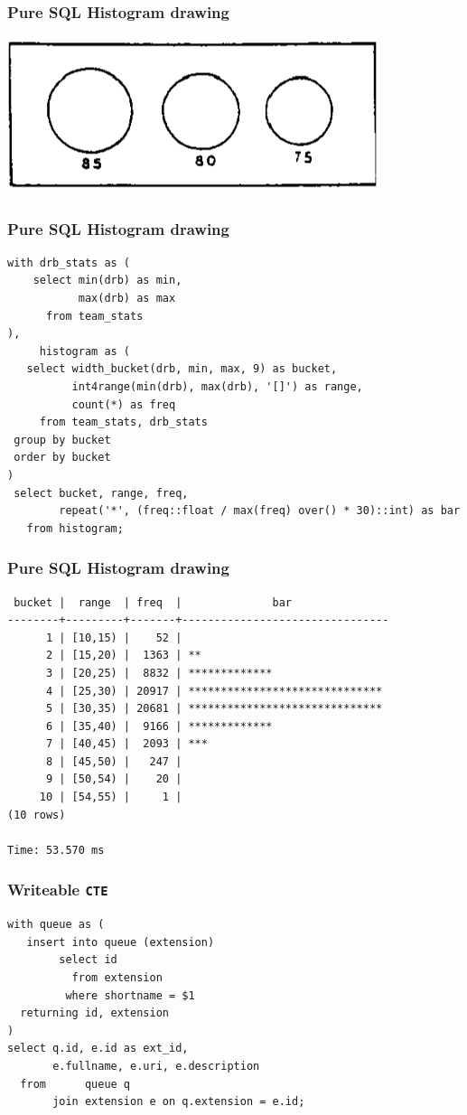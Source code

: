 \documentclass{beamer}
\begin{document}
\begin{frame}
  \frametitle{Pure SQL Histogram drawing}

  \begin{center}
    \includegraphics[height=1.8in]{histogram.png}
  \end{center}
\end{frame}

\begin{frame}[fragile]
  \frametitle{Pure SQL Histogram drawing}
  
  \begin{verbatim}
with drb_stats as (
    select min(drb) as min,
           max(drb) as max
      from team_stats
),
     histogram as (
   select width_bucket(drb, min, max, 9) as bucket,
          int4range(min(drb), max(drb), '[]') as range,
          count(*) as freq
     from team_stats, drb_stats
 group by bucket
 order by bucket
)
 select bucket, range, freq,
        repeat('*', (freq::float / max(freq) over() * 30)::int) as bar
   from histogram;
  \end{verbatim}
\end{frame}

\begin{frame}[fragile]
  \frametitle{Pure SQL Histogram drawing}
  
  \begin{verbatim}
 bucket |  range  | freq  |              bar               
--------+---------+-------+--------------------------------
      1 | [10,15) |    52 | 
      2 | [15,20) |  1363 | **
      3 | [20,25) |  8832 | *************
      4 | [25,30) | 20917 | ******************************
      5 | [30,35) | 20681 | ******************************
      6 | [35,40) |  9166 | *************
      7 | [40,45) |  2093 | ***
      8 | [45,50) |   247 | 
      9 | [50,54) |    20 | 
     10 | [54,55) |     1 | 
(10 rows)

Time: 53.570 ms
\end{verbatim}
\end{frame}

\begin{frame}[fragile]
  \frametitle{Writeable \texttt{CTE}}
  
  \begin{verbatim}
with queue as (
   insert into queue (extension)
        select id
          from extension
         where shortname = $1
  returning id, extension
)
select q.id, e.id as ext_id,
       e.fullname, e.uri, e.description
  from      queue q
       join extension e on q.extension = e.id;    
  \end{verbatim}
\end{frame}
\end{document}
